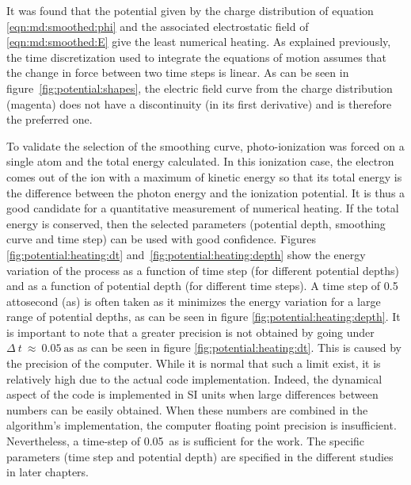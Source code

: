 It was found that the potential given by the charge distribution of equation
\eqref{eqn:md:smoothed:phi} and the associated electrostatic field of
\eqref{eqn:md:smoothed:E} give the least numerical heating. As explained
previously, the time discretization used to integrate the equations of motion
assumes that the change in force between two time steps is linear. As can be
seen in figure~\ref{fig:potential:shapes}, the electric field curve from the
charge distribution
(magenta) does not have a discontinuity (in its first derivative)
and is therefore the preferred one.

To validate the selection of the smoothing curve, photo-ionization was forced
on a single atom and the total energy calculated. In this ionization case, the
electron comes out of the ion with a maximum of kinetic energy so that
its total energy is the difference between the photon energy and the ionization
potential. It is thus a good candidate for a quantitative measurement of
numerical heating. If the total
energy is conserved, then the selected parameters (potential depth, smoothing
curve and time step) can be used with good confidence. Figures
\ref{fig:potential:heating:dt} and~\ref{fig:potential:heating:depth} show the
energy variation of the process as a function of time step (for different
potential depths) and as a function of potential depth (for different time
steps). A time step of 0.5 attosecond (as) is often taken as
it minimizes the energy variation for a large
range of potential depths, as can be seen in figure
\ref{fig:potential:heating:depth}.
It is important to note that a greater precision is not obtained by going
under $\Delta~t~\approx~0.05~\textrm{as}$ as can be seen in figure
\ref{fig:potential:heating:dt}. This is caused by the precision of the computer.
While it is normal that such a limit exist, it is relatively high due to the
actual code implementation. Indeed, the dynamical aspect of the code is
implemented in SI units when large differences between numbers can be easily
obtained. When these numbers are combined in the algorithm's implementation,
the computer floating point precision is insufficient. Nevertheless, a time-step
of 0.05~as is sufficient for the work. The specific
parameters (time step and potential depth) are specified in the different
studies in later chapters.

